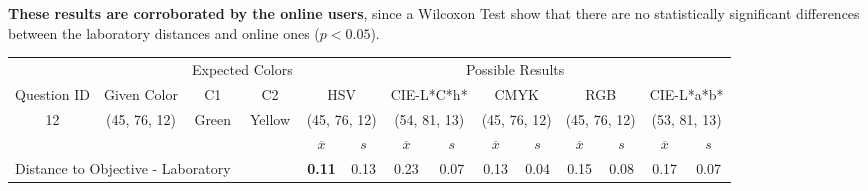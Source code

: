 \textbf{These results are corroborated by the online users}, since a Wilcoxon Test show that there are no statistically significant differences between the laboratory distances and online ones ($p < 0.05$).
%
\begin{table}[H]
  \resizebox{\textwidth}{!} {
  \begin{tabular}{lccccccccccccc}
    \hline
    \multicolumn{1}{c}{}                              &                                      & \multicolumn{2}{c}{Expected Colors}                   & \multicolumn{10}{c}{Possible Results}                                                                                                                                                                                                                                                                                        \\ \cline{3-14}
    \multicolumn{1}{c}{\multirow{-2}{*}{Question ID}} & \multirow{-2}{*}{Given Color}        & C1                       & C2                         & \multicolumn{2}{c}{HSV}                                        & \multicolumn{2}{c}{CIE-L*C*h*}                                 & \multicolumn{2}{c}{CMYK}                                       & \multicolumn{2}{c}{RGB}                                        & \multicolumn{2}{c}{CIE-L*a*b*}                                 \\ \hline
    \multicolumn{1}{c}{12}                             & \cellcolor[HTML]{80FF00}(45, 76, 12) & \multicolumn{1}{c|}{Green} & \multicolumn{1}{c|}{Yellow}  & \multicolumn{2}{c|}{\cellcolor[HTML]{80FF00}(45, 76, 12)}      & \multicolumn{2}{c|}{\cellcolor[HTML]{B1FF00}(54, 81, 13)}       & \multicolumn{2}{c|}{\cellcolor[HTML]{80FF00}(45, 76, 12)}       & \multicolumn{2}{c|}{\cellcolor[HTML]{80FF00}(45, 76, 12)}       & \multicolumn{2}{c|}{\cellcolor[HTML]{AEFF00}(53, 81, 13)}       \\ \hline
                                                      & \multicolumn{1}{l}{}                 & \multicolumn{1}{l}{}     & \multicolumn{1}{l}{}       & \multicolumn{1}{c}{$\overline{x}$} & \multicolumn{1}{c}{$s$} & \multicolumn{1}{c}{$\overline{x}$} & \multicolumn{1}{c}{$s$} & \multicolumn{1}{c}{$\overline{x}$} & \multicolumn{1}{c}{$s$} & \multicolumn{1}{c}{$\overline{x}$} & \multicolumn{1}{c}{$s$} & \multicolumn{1}{c}{$\overline{x}$} & \multicolumn{1}{c}{$s$} \\ \hline
    \multicolumn{4}{l}{Distance to Objective - Laboratory}                                                                                           & \multicolumn{1}{|c}{\textbf{0.11}}       & \multicolumn{1}{c|}{0.13}    & \multicolumn{1}{|c}{0.23}       & \multicolumn{1}{c|}{0.07}    & \multicolumn{1}{|c}{0.13}       & \multicolumn{1}{c|}{0.04}    & \multicolumn{1}{|c}{0.15}       & \multicolumn{1}{c|}{0.08}    & \multicolumn{1}{|c}{0.17}       & \multicolumn{1}{c|}{0.07}    \\

\end{tabular}}
\end{table}
